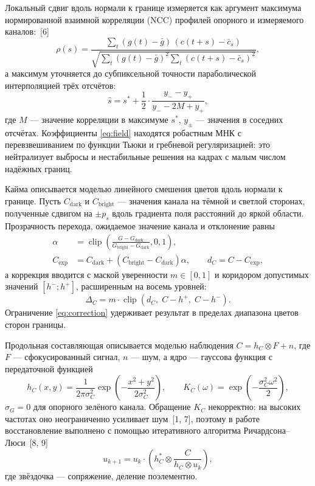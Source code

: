 \documentclass[a4paper,14pt,oneside]{extreport}
\begin{document}
Локальный сдвиг вдоль нормали к границе измеряется как аргумент максимума
нормированной взаимной корреляции (NCC) профилей опорного и
измеряемого каналов:~[6]
\begin{equation}
\rho(s)=\frac{\sum_t (g(t)-\bar g)\,(c(t+s)-\bar c_s)}
{\sqrt{\sum_t (g(t)-\bar g)^2\sum_t (c(t+s)-\bar c_s)^2}},
\label{eq:ncc}
\end{equation}
а максимум уточняется до субпиксельной точности параболической
интерполяцией трёх отсчётов:
\begin{equation}
\hat s=s^{*}+\frac{1}{2}\cdot\frac{y_{-}-y_{+}}{y_{-}-2M+y_{+}},
\label{eq:subpixel}
\end{equation}
где $M$ --- значение корреляции в максимуме $s^{*}$, $y_{\pm}$ ---
значения в соседних отсчётах. Коэффициенты \eqref{eq:field} находятся
робастным МНК с перевзвешиванием по функции Тьюки и гребневой
регуляризацией: это нейтрализует выбросы и нестабильные решения на кадрах с
малым числом надёжных границ.

Кайма описывается моделью линейного смешения цветов вдоль нормали к
границе. Пусть $C_{\text{dark}}$ и $C_{\text{bright}}$ --- значения канала
на тёмной и светлой сторонах, полученные сдвигом на $\pm p_s$ вдоль
градиента поля расстояний до яркой области. Прозрачность перехода,
ожидаемое значение канала и отклонение равны
\begin{equation}
\begin{aligned}
\alpha&=\operatorname{clip}\!\left(\frac{G-G_{\text{dark}}}
{G_{\text{bright}}-G_{\text{dark}}},0,1\right),\\
C_{\text{exp}}&=C_{\text{dark}}+(C_{\text{bright}}-C_{\text{dark}})\alpha,
\qquad d_C=C-C_{\text{exp}},
\end{aligned}
\label{eq:fringe}
\end{equation}
а коррекция вводится с маской уверенности $m\in[0,1]$ и коридором
допустимых значений $[h^{-};h^{+}]$, расширенным на восемь уровней:
\begin{equation}
\Delta_C=m\cdot\operatorname{clip}\!\left(d_C,\;C-h^{+},\;C-h^{-}\right).
\label{eq:correction}
\end{equation}
Ограничение \eqref{eq:correction} удерживает результат в пределах диапазона
цветов сторон границы.

Продольная составляющая описывается моделью наблюдения
$C=h_C\otimes F+n$, где $F$ --- сфокусированный сигнал, $n$ --- шум, а ядро
--- гауссова функция с передаточной функцией
\begin{equation}
h_C(x,y)=\frac{1}{2\pi\sigma_C^2}\exp\!\left(-\frac{x^2+y^2}
{2\sigma_C^2}\right),\qquad
K_C(\omega)=\exp\!\left(-\frac{\sigma_C^2\omega^2}{2}\right),
\label{eq:axial_kernel}
\end{equation}
$\sigma_G=0$ для опорного зелёного канала. Обращение $K_C$ некорректно:
на высоких частотах оно неограниченно усиливает шум~[1, 7], поэтому в работе
восстановление выполнено с помощью итеративного алгоритма
Ричардсона--Люси~[8, 9]
\begin{equation}
u_{k+1}=u_k\cdot\left(h_C^{*}\otimes\frac{C}{h_C\otimes u_k}\right),
\label{eq:rl}
\end{equation}
где звёздочка --- сопряжение, деление поэлементно.
\end{document}
